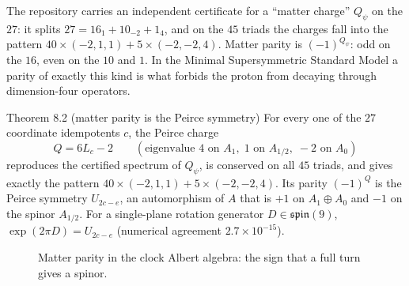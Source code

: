The repository carries an independent certificate for a ``matter charge'' $Q_\psi$ on the
$27$: it splits $27=16_1+10_{-2}+1_4$, and on the $45$ triads the charges fall into the
pattern $40\times(-2,1,1)+5\times(-2,-2,4)$. Matter parity is $(-1)^{Q_\psi}$: odd on the
$16$, even on the $10$ and $1$. In the Minimal Supersymmetric Standard Model a parity of
exactly this kind is what forbids the proton from decaying through dimension-four
operators.

\begin{result}{Theorem 8.2 (matter parity is the Peirce symmetry) \hfill \tierC}
For every one of the $27$ coordinate idempotents $c$, the Peirce charge
\[
Q=6L_c-2\qquad(\text{eigenvalue }4\text{ on }A_1,\;1\text{ on }A_{1/2},\;-2\text{ on }A_0)
\]
reproduces the certified spectrum of $Q_\psi$, is conserved on all $45$ triads, and
gives exactly the pattern $40\times(-2,1,1)+5\times(-2,-2,4)$. Its parity $(-1)^Q$ is the
Peirce symmetry $U_{2c-e}$, an automorphism of $A$ that is $+1$ on $A_1\oplus A_0$ and $-1$
on the spinor $A_{1/2}$. For a single-plane rotation generator $D\in\mathfrak{spin}(9)$,
$\exp(2\pi D)=U_{2c-e}$ (numerical agreement $2.7\times10^{-15}$).
\end{result}

\begin{figure}[htbp]
\centering
{}
\caption{Matter parity in the clock Albert algebra: the sign that a full turn gives a spinor.}
\label{fig:parity}
\end{figure}

